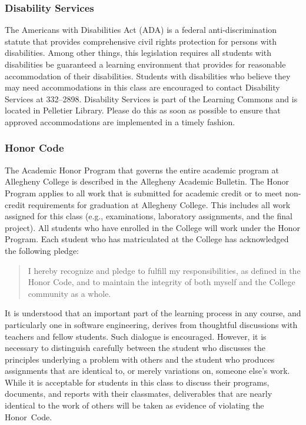 \documentclass[11pt]{article}
\begin{document}
\subsubsection*{Disability Services}

The Americans with Disabilities Act (ADA) is a federal anti-discrimination
statute that provides comprehensive civil rights protection for persons with
disabilities. Among other things, this legislation requires all students with
disabilities be guaranteed a learning environment that provides for reasonable
accommodation of their disabilities. Students with disabilities who believe they
may need accommodations in this class are encouraged to contact Disability
Services at 332--2898. Disability Services is part of the Learning Commons and
is located in Pelletier Library. Please do this as soon as possible to ensure
that approved accommodations are implemented in a timely fashion.

\subsubsection*{Honor Code}

The Academic Honor Program that governs the entire academic program at Allegheny
College is described in the Allegheny Academic Bulletin. The Honor Program
applies to all work that is submitted for academic credit or to meet non-credit
requirements for graduation at Allegheny College. This includes all work
assigned for this class (e.g., examinations, laboratory assignments, and the
final project). All students who have enrolled in the College will work under
the Honor Program. Each student who has matriculated at the College has
acknowledged the following pledge:

%
\begin{quote}
%
  I hereby recognize and pledge to fulfill my responsibilities, as defined in
  the Honor Code, and to maintain the integrity of both myself and the College
  community as a whole.
%
\end{quote}
%

\noindent It is understood that an important part of the learning process in any
course, and particularly one in software engineering, derives from thoughtful
discussions with teachers and fellow students. Such dialogue is encouraged.
However, it is necessary to distinguish carefully between the student who
discusses the principles underlying a problem with others and the student who
produces assignments that are identical to, or merely variations on, someone
else's work. While it is acceptable for students in this class to discuss their
programs, documents, and reports with their classmates, deliverables that are
nearly identical to the work of others will be taken as evidence of violating
the \mbox{Honor Code}.
\end{document}
